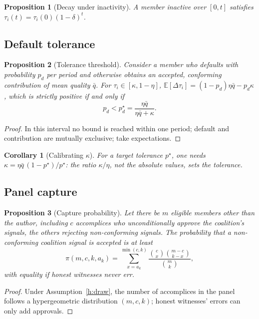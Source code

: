 \documentclass[11pt,a4paper]{article}
\theoremstyle{plain}
\newtheorem{proposition}{Proposition}
\newtheorem{corollary}{Corollary}
\theoremstyle{definition}
\theoremstyle{remark}
\newcommand{\1}{\mathbf{1}}
\newcommand{\E}{\mathbb{E}}
\begin{document}
\begin{proposition}[Decay under inactivity]
A member inactive over $[0,t]$ satisfies $\tau_i(t)=\tau_i(0)(1-\delta)^t$.
\end{proposition}

\subsection{Default tolerance}

\begin{proposition}[Tolerance threshold]\label{prop:default}
Consider a member who defaults with probability $p_d$ per period and otherwise
obtains an accepted, conforming contribution of mean quality $\bar q$. For
$\tau_i\in[\kappa,1-\eta]$, $\E[\Delta\tau_i]=(1-p_d)\eta\bar q-p_d\kappa$,
which is strictly positive if and only if
\begin{equation}
p_d<p^\star_d=\frac{\eta\bar q}{\eta\bar q+\kappa}.
\label{eq:pstar}
\end{equation}
\end{proposition}
\begin{proof}
In this interval no bound is reached within one period; default and
contribution are mutually exclusive; take expectations.
\end{proof}

\begin{corollary}[Calibrating $\kappa$]\label{cor:kappa}
For a target tolerance $p^\star$, one needs
$\kappa=\eta\bar q\,(1-p^\star)/p^\star$: the ratio $\kappa/\eta$, not the
absolute values, sets the tolerance.
\end{corollary}

\subsection{Panel capture}

\begin{proposition}[Capture probability]\label{prop:capture}
Let there be $m$ eligible members other than the author, including $c$
accomplices who unconditionally approve the coalition's signals, the others
rejecting non-conforming signals. The probability that a non-conforming
coalition signal is accepted is at least
\begin{equation}
\pi(m,c,k,a_k)=\sum_{x=a_k}^{\min(c,k)}
\frac{\binom{c}{x}\binom{m-c}{k-x}}{\binom{m}{k}},
\label{eq:hyper}
\end{equation}
with equality if honest witnesses never err.
\end{proposition}
\begin{proof}
Under Assumption~\ref{h:draw}, the number of accomplices in the panel follows a
hypergeometric distribution $(m,c,k)$; honest witnesses' errors can only add
approvals.
\end{proof}
\end{document}
